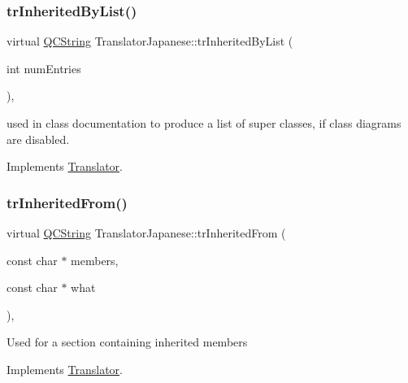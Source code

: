 \mbox{\label{class_translator_japanese_acacdae5b68f4284239a14ab975cfec20}} 
\subsubsection{\texorpdfstring{trInheritedByList()}{trInheritedByList()}}
{\footnotesize\ttfamily virtual \mbox{\hyperlink{class_q_c_string}{Q\+C\+String}} Translator\+Japanese\+::tr\+Inherited\+By\+List (\begin{DoxyParamCaption}\item[{int}]{num\+Entries }\end{DoxyParamCaption})\hspace{0.3cm}{\ttfamily [inline]}, {\ttfamily [virtual]}}

used in class documentation to produce a list of super classes, if class diagrams are disabled. 

Implements \mbox{\hyperlink{class_translator}{Translator}}.

\mbox{\label{class_translator_japanese_a3204ade1900029b4523906972c629b48}} 
\subsubsection{\texorpdfstring{trInheritedFrom()}{trInheritedFrom()}}
{\footnotesize\ttfamily virtual \mbox{\hyperlink{class_q_c_string}{Q\+C\+String}} Translator\+Japanese\+::tr\+Inherited\+From (\begin{DoxyParamCaption}\item[{const char $\ast$}]{members,  }\item[{const char $\ast$}]{what }\end{DoxyParamCaption})\hspace{0.3cm}{\ttfamily [inline]}, {\ttfamily [virtual]}}

Used for a section containing inherited members 

Implements \mbox{\hyperlink{class_translator}{Translator}}.

\mbox{\label{class_translator_japanese_a591e1b53f07df66db75f27177d15cd4e}} 
